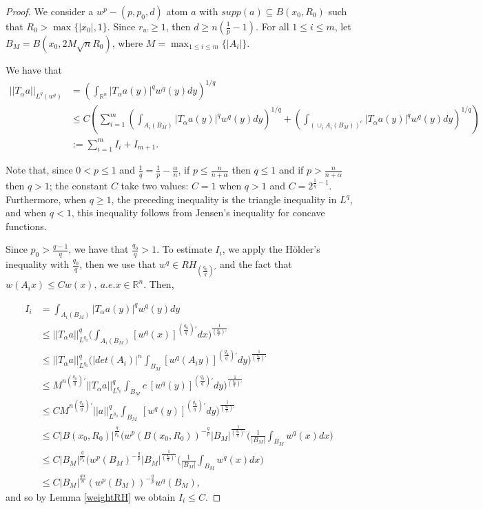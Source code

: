 \documentclass[a4paper,12pt,reqno]{amsart}
\numberwithin{equation}{section}
\begin{document}
	
	\begin{proof}
		We consider a $w^p-(p,p_0, d)$ atom
		$a$  with $supp(a) \subseteq B(x_0,R_0)$ such that $R_0>\max\{|x_0|,1\}$. Since $r_w \geq 1$, then $d\geq n(\frac 1p-1)$. For all $1 \leq i \leq m$, let $B_M=B(x_0, 2M\sqrt n  R_0)$, where $
		M=\max_{1\leq i\leq m}\{|A_i|\}$. 
		
		We have that
		$$
		\begin{aligned}
			||T_\alpha a||_{L^q(w^q)}&=\left(\int_{\mathbb{R}^n} |T_\alpha a(y)|^qw^q(y)dy\right)^{1/q}\\
			&\leq   C \left( \sum_{i=1}^m\left(\int_{A_i(B_M)} |T_\alpha a(y)|^qw^q(y)dy\right)^{1/q}+\left(\int_{(\cup_i A_i(B_M))^c} |T_\alpha a(y)|^qw^q(y)dy\right)^{1/q}\right)\\
			&:=\sum _{i=1}^mI_i+I_{m+1}.
		\end{aligned}
		$$
		
		Note that, since $0<p\leq 1$ and $\frac{1}{q}=\frac{1}{p} - \frac{\alpha}{n}$, if $p \leq \frac{n}{n+\alpha}$ then $q\leq 1$ and if $p> \frac{n}{n+\alpha}$ then $q>1$; the constant $C$ take two values: $C=1$ when $q>1$ and $C=2^{\frac{1}{q} -1}$. Furthermore, when $q \geq 1$, the preceding inequality is the triangle inequality in $L^q$, and when $q<1$, this inequality follows from Jensen's inequality for concave functions.
		
		Since $p_0 > \frac{q-1}{q}$, we have that $\frac{q_0}{q}>1$. 
		To estimate $I_i$, we apply the H\"{o}lder's inequality with $\frac{q_0}{q}$, then we use that $w^{q} \in RH_{(\frac{q_0}{q})'}$ and the fact that $w(A_ix) \leq C w(x), \ a.e.x\in \mathbb{R}^n$. Then,
		
		$$
		\begin{aligned}
			I_i & =\int_{A_i(B_M)} |T_\alpha a(y)|^qw^q(y)dy \\
			&\leq ||T_{\alpha}a||^{q}_{L^{q_0}} \Big(\int_{A_i(B_M)}[w^{q}(x)]^{(\frac{q_0}{q})'} dx\Big)^{\frac{1}{(\frac{q_0}{q})'}}\\
			&\leq ||T_{\alpha}a||^{q}_{L^{q_0}} \Big(|det(A_i)|^{n}\int_{B_M}[w^{q}(A_iy)]^{(\frac{q_0}{q})'} dy\Big)^{\frac{1}{(\frac{q_0}{q})'}}\\
			& \leq M^{n(\frac{q_0}{q})'}||T_{\alpha}a||^{q}_{L^{q_0}} \int_{B_M} c \ [w^{q}(y)]^{(\frac{q_0}{q})'} dy\Big)^{\frac{1}{(\frac{q_0}{q})'}}\\
			& \leq C M^{n(\frac{q_0}{q})'}||a||^{q}_{L^{p_0}} \int_{B_M}  \ [w^{q}(y)]^{(\frac{q_0}{q})'} dy\Big)^{\frac{1}{(\frac{q_0}{q})'}}\\
			& \leq C|B(x_0,R_0)|^{\frac{q}{p_0}} (w^{p}(B(x_0,R_0))^{-\frac{q}{p}} |B_M|^{\frac{1}{(\frac{q_0}{q})'}} \Big(\frac{1}{|B_M|} \int_{B_M} w^{q}(x)dx\Big) \\
			& \leq C|B_{M}|^{\frac{q}{p_0}} (w^{p}(B_M)^{-\frac{q}{p}} |B_M|^{\frac{1}{(\frac{q_0}{q})'}} \Big(\frac{1}{|B_M|} \int_{B_M} w^{q}(x)dx\Big) \\
			& \leq C |B_M|^{\frac{q\alpha}{n}} (w^{p}(B_M))^{-\frac{q}{p}} w^{q}(B_M),
		\end{aligned}
		$$
		and so by Lemma \ref{weightRH} we obtain $I_i \leq C$.
		

\end{proof}
\end{document}
